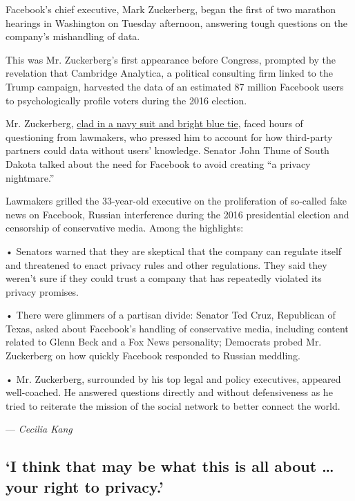 Facebook's chief executive, Mark Zuckerberg, began the first of two
marathon hearings in Washington on Tuesday afternoon, answering tough
questions on the company's mishandling of data.

This was Mr. Zuckerberg's first appearance before Congress, prompted by
the revelation that Cambridge Analytica, a political consulting firm
linked to the Trump campaign, harvested the data of an estimated 87
million Facebook users to psychologically profile voters during the 2016
election.

Mr. Zuckerberg,
\href{https://www.nytimes3xbfgragh.onion/2018/04/10/fashion/mark-zuckerberg-suit-congress.html}{clad
in a navy suit and bright blue tie}, faced hours of questioning from
lawmakers, who pressed him to account for how third-party partners could
data without users' knowledge. Senator John Thune of South Dakota talked
about the need for Facebook to avoid creating ``a privacy nightmare.''

Lawmakers grilled the 33-year-old executive on the proliferation of
so-called fake news on Facebook, Russian interference during the 2016
presidential election and censorship of conservative media. Among the
highlights:

• Senators warned that they are skeptical that the company can regulate
itself and threatened to enact privacy rules and other regulations. They
said they weren't sure if they could trust a company that has repeatedly
violated its privacy promises.

• There were glimmers of a partisan divide: Senator Ted Cruz, Republican
of Texas, asked about Facebook's handling of conservative media,
including content related to Glenn Beck and a Fox News personality;
Democrats probed Mr. Zuckerberg on how quickly Facebook responded to
Russian meddling.

• Mr. Zuckerberg, surrounded by his top legal and policy executives,
appeared well-coached. He answered questions directly and without
defensiveness as he tried to reiterate the mission of the social network
to better connect the world.

--- \emph{Cecilia Kang}

\hypertarget{i-think-that-may-be-what-this-is-all-about--your-right-to-privacy}{%
\subsection{`I think that may be what this is all about \ldots{} your
right to
privacy.'}\label{i-think-that-may-be-what-this-is-all-about--your-right-to-privacy}}

